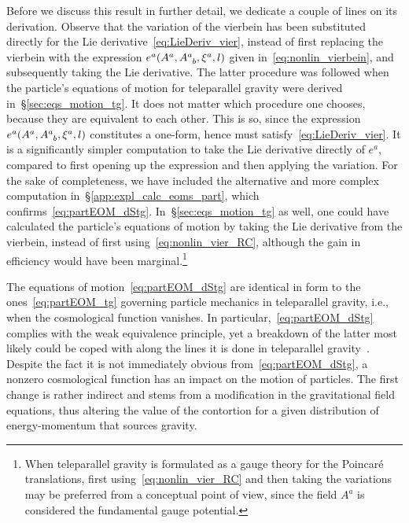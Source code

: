 \documentclass[
final,
11pt,
a4paper,
DIV=11,
headinclude=true,
footinclude=false,
bibliography=totoc,
twoside=true,  %
BCOR=5mm
]{scrbook}
\begin{document}
Before we discuss this result in further detail, we dedicate 
a couple of lines on its derivation. Observe that the variation 
of the vierbein has been substituted directly for the Lie 
derivative~\eqref{eq:LieDeriv_vier}, instead of first replacing 
the vierbein with the expression $e^a(A^a, A\ind{^a_b}, \xi^a, 
l)$ given in~\eqref{eq:nonlin_vierbein}, and subsequently taking 
the Lie derivative. The latter procedure was followed when the 
particle's equations of motion for teleparallel gravity were 
derived in~\S\ref{sec:eqs_motion_tg}. It does not matter which 
procedure one chooses, because they are equivalent to each other.  
This is so, since the expression $e^a(A^a, A\ind{^a_b}, \xi^a, 
l)$ constitutes a one-form, hence must 
satisfy~\eqref{eq:LieDeriv_vier}. It is a significantly simpler 
computation to take the Lie derivative directly of $e^a$, 
compared to first opening up the expression and then applying the 
variation. For the sake of completeness, we have included the 
alternative and more complex computation 
in~\S\ref{app:expl_calc_eoms_part}, which 
confirms~\eqref{eq:partEOM_dStg}. In~\S\ref{sec:eqs_motion_tg} as 
well, one could have calculated the particle's equations of 
motion by taking the Lie derivative from the vierbein, instead of 
first using~\eqref{eq:nonlin_vier_RC}, although the gain in 
efficiency would have been marginal.\footnote{When teleparallel 
  gravity is formulated as a gauge theory for the Poincar\'e 
  translations, first using~\eqref{eq:nonlin_vier_RC} and then 
  taking the variations may be preferred from a conceptual point 
  of view, since the field $A^a$ is considered the fundamental 
  gauge potential.}

The equations of motion~\eqref{eq:partEOM_dStg} are identical in 
form to the ones~\eqref{eq:partEOM_tg} governing particle 
mechanics in teleparallel gravity, i.e., when the cosmological 
function vanishes. In particular,~\eqref{eq:partEOM_dStg} 
complies with the weak equivalence principle, yet a breakdown of 
the latter most likely could be coped with along the lines it is 
done in teleparallel gravity~\cite{Aldrovandi:2003pa}. Despite 
the fact it is not immediately obvious 
from~\eqref{eq:partEOM_dStg}, a nonzero cosmological function has 
an impact on the motion of particles.  The first change is rather 
indirect and stems from a modification in the gravitational field 
equations, thus altering the value of the contortion for a given 
distribution of energy-momentum that sources gravity.
\end{document}
